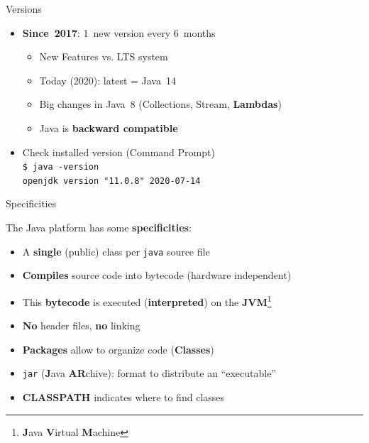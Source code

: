 \documentclass[English,c,%
hyperref={%
    pdftitle={FISA-DE2 OOP in Java},%
    pdfauthor={Muller, Gravier, Laforest, Subercaze},%
    pdfsubject={OOP in Java},%
    pdfkeywords={OOP, Java},%
    colorlinks=true,%
    urlcolor=blue,%
    linkcolor=%
    },%
xcolor={pdftex,svgnames} %
]{beamer}
\begin{document}
\begin{frame}{Versions}
%
  \begin{itemize}
    \item \textbf{Since~2017}: 1~new version every 6~months
    \begin{itemize}
      \item New Features vs. LTS system
      \item Today (2020): latest = Java~14
      \item Big changes in Java~8 (Collections, Stream, \textbf{Lambdas})
      \item Java is \textbf{backward compatible}
    \end{itemize}
    \medskip
    \item Check installed version (Command Prompt)\\
    \texttt{\$ java -version}\\
    \texttt{openjdk version "11.0.8" 2020-07-14}
  \end{itemize}

\end{frame}

\begin{frame}{Specificities}

  The Java platform has some \textbf{specificities}:
  \medskip
  \begin{itemize}
    \item A \textbf{single} (public) class per \texttt{java} source file
    \medskip
    \item \textbf{Compiles} source code into bytecode (hardware independent)
    \medskip
    \item This \textbf{bytecode} is executed (\textbf{interpreted}) on the \textbf{JVM}\footnote{\textbf{J}ava \textbf{V}irtual \textbf{M}achine}
    \medskip
    \item \textbf{No} header files, \textbf{no} linking
    \medskip
    \item \textbf{Packages} allow to organize code (\textbf{Classes})
    \medskip
    \item \texttt{jar} (\textbf{J}ava \textbf{AR}chive): format to distribute an ``executable''
    \medskip
    \item \textbf{CLASSPATH} indicates where to find classes
  \end{itemize}

\end{frame}
\end{document}
